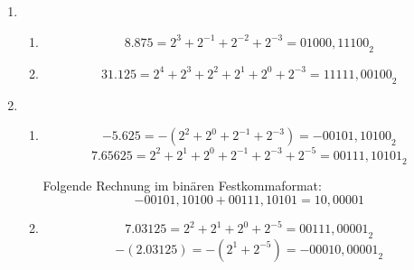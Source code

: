 \documentclass[DIN, pagenumber=false, fontsize=11pt, parskip=half]{scrartcl}
\begin{document}
    \subsection{}
    \begin{enumerate}[label=(\alph*)]
        \item 
            \begin{enumerate}[label=(\roman*)]
                \item 
                    \begin{equation*}
                        8.875 = 2^3 + 2^{-1} + 2^{-2} + 2^{-3} = {01000,11100}_2
                    \end{equation*}
                \item
                    \begin{equation*}
                        31.125 = 2^4 + 2^3 + 2^2 + 2^1  + 2^0 + 2^{-3} = {11111,00100}_2
                    \end{equation*}
            \end{enumerate}
        \item 
            \begin{enumerate}[label=(\roman*)]
                \item
                    \begin{equation*}
                        -5.625 = -(2^2 + 2^0 + 2^{-1} + 2^{-3}) = {-00101,10100}_2
                    \end{equation*}
                    \begin{equation*}
                        7.65625 = 2^2 + 2^1 + 2^0 +2^{-1} + 2^{-3} + 2^{-5} = {00111,10101}_2
                    \end{equation*}

                    Folgende Rechnung im binären Festkommaformat:
                    \begin{equation*}
                        -00101,10100 + 00111,10101 = 10,00001
                    \end{equation*}
                \item
                    \begin{equation*}
                        7.03125 = 2^2 + 2^1 + 2^0 + 2^{-5} = {00111,00001}_2
                    \end{equation*}
                    \begin{equation*}
                        -(2.03125) = -(2^1 + 2^{-5}) = -{00010,00001}_2
                    \end{equation*}
                    

\end{enumerate}
\end{enumerate}
\end{document}
